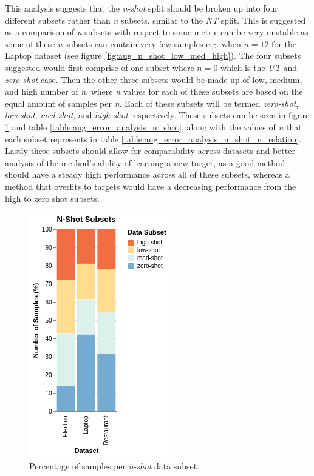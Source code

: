 This analysis suggests that the \textit{n-shot} split should be broken up into four different subsets rather than \textit{n} subsets, similar to the \textit{NT} split. This is suggested as a comparison of \textit{n} subsets with respect to some metric can be very unstable as some of these \textit{n} subsets can contain very few samples e.g. when $n=12$ for the Laptop dataset (see figure \ref{fig:aug_n_shot_low_med_high}). The four subsets suggested would first comprise of one subset where $n=0$ which is the \textit{UT} and \textit{zero-shot} case. Then the other three subsets would be made up of low, medium, and high number of \textit{n}, where \textit{n} values for each of these subsets are based on the equal amount of samples per \textit{n}. Each of these subsets will be termed \textit{zero-shot}, \textit{low-shot}, \textit{med-shot}, and \textit{high-shot} respectively. These subsets can be seen in figure \ref{fig:aug_error_analysis_n_shot_discrete} and table \ref{table:aug_error_analysis_n_shot}, along with the values of \textit{n} that each subset represents in table \ref{table:aug_error_analysis_n_shot_n_relation}. Lastly these subsets should allow for comparability across datasets and better analysis of the method's ability of learning a new target, as a good method should have a steady high performance across all of these subsets, whereas a method that overfits to targets would have a decreasing performance from the high to zero shot subsets.

\begin{figure}[!ht]
    \centering
    \includegraphics[scale=0.6]{images/augmentation/error_analysis/n_shot_discrete.png}
    \caption{Percentage of samples per \textit{n-shot} data subset.}
    \label{fig:aug_error_analysis_n_shot_discrete}
\end{figure}

